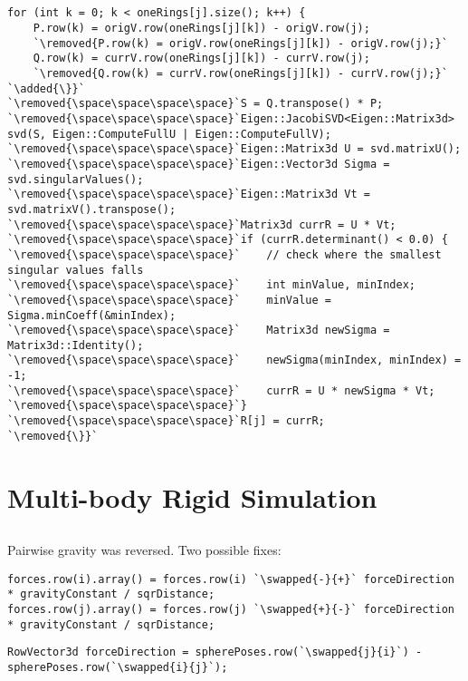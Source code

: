 \documentclass[12pt, a4paper]{article}
\newcommand{\removed}[1]{\colorbox{pink}{\vphantom{A}#1}}
\newcommand{\added}[1]{\colorbox{lime}{\vphantom{A}#1}}
\newcommand{\swapped}[2]{\removed{#1}\added{#2}}
\newcommand{\inline}[1]{\fbox{\texttt{#1}}}
\begin{document}
    \subsection{}
        \begin{lstlisting}[caption={Lines 3 and 5 have been removed. The \inline{for} loop is now closed 
            on line 6 instead of 22. Lines 7 to 21 are no longer indented.}, label={lst:c1}]
for (int k = 0; k < oneRings[j].size(); k++) {
    P.row(k) = origV.row(oneRings[j][k]) - origV.row(j);
    `\removed{P.row(k) = origV.row(oneRings[j][k]) - origV.row(j);}`
    Q.row(k) = currV.row(oneRings[j][k]) - currV.row(j);
    `\removed{Q.row(k) = currV.row(oneRings[j][k]) - currV.row(j);}`
`\added{\}}`
`\removed{\space\space\space\space}`S = Q.transpose() * P;
`\removed{\space\space\space\space}`Eigen::JacobiSVD<Eigen::Matrix3d> svd(S, Eigen::ComputeFullU | Eigen::ComputeFullV);
`\removed{\space\space\space\space}`Eigen::Matrix3d U = svd.matrixU();
`\removed{\space\space\space\space}`Eigen::Vector3d Sigma = svd.singularValues();
`\removed{\space\space\space\space}`Eigen::Matrix3d Vt = svd.matrixV().transpose();
`\removed{\space\space\space\space}`Matrix3d currR = U * Vt;
`\removed{\space\space\space\space}`if (currR.determinant() < 0.0) {
`\removed{\space\space\space\space}`    // check where the smallest singular values falls
`\removed{\space\space\space\space}`    int minValue, minIndex;
`\removed{\space\space\space\space}`    minValue = Sigma.minCoeff(&minIndex);
`\removed{\space\space\space\space}`    Matrix3d newSigma = Matrix3d::Identity();
`\removed{\space\space\space\space}`    newSigma(minIndex, minIndex) = -1;
`\removed{\space\space\space\space}`    currR = U * newSigma * Vt;
`\removed{\space\space\space\space}`}
`\removed{\space\space\space\space}`R[j] = currR;
`\removed{\}}`
            \end{lstlisting}

\section{Multi-body Rigid Simulation}
    \subsection{}
        Pairwise gravity was reversed.
        Two possible fixes:
        \begin{lstlisting}[caption={The \inline{+} and \inline{-} have been swapped.}, label={lst:d1}]
forces.row(i).array() = forces.row(i) `\swapped{-}{+}` forceDirection * gravityConstant / sqrDistance;
forces.row(j).array() = forces.row(j) `\swapped{+}{-}` forceDirection * gravityConstant / sqrDistance;
\end{lstlisting}
        \begin{lstlisting}[caption={The \inline{i} and \inline{j} have been swapped.}, label={lst:e1}]
RowVector3d forceDirection = spherePoses.row(`\swapped{j}{i}`) - spherePoses.row(`\swapped{i}{j}`);
\end{lstlisting}
\end{document}
